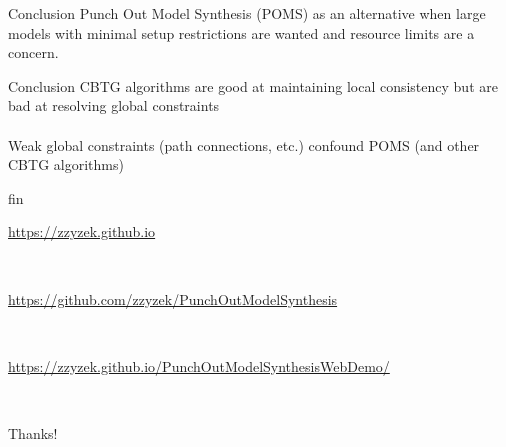 \documentclass{beamer}
\begin{document}


  \begin{frame}[fragile]{Conclusion}
    Punch Out Model Synthesis (POMS) as an alternative when large models with minimal setup restrictions are wanted
    and resource limits are a concern.
  \end{frame}

  \begin{frame}[fragile]{Conclusion}
    CBTG algorithms are good at maintaining local consistency but are bad at resolving global constraints \\
    \hfill \\
    Weak global constraints (path connections, etc.) confound POMS (and other CBTG algorithms) \\
  \end{frame}

  \begin{frame}[fragile]{fin}
    \begin{center}\url{https://zzyzek.github.io}\end{center}
    \hfill \\
    \begin{center}\url{https://github.com/zzyzek/PunchOutModelSynthesis}\end{center}
    \hfill \\
    \begin{center}\small\url{https://zzyzek.github.io/PunchOutModelSynthesisWebDemo/}\end{center}
    \hfill \\
    \begin{center}Thanks!\end{center}
  \end{frame}

  \appendix
\end{document}
